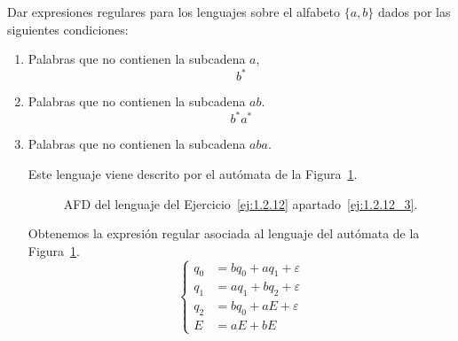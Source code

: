 \begin{ejercicio} \label{ej:1.2.12}
    Dar expresiones regulares para los lenguajes sobre el alfabeto $\{a, b\}$ dados por las siguientes condiciones:
    \begin{enumerate}
        \item Palabras que no contienen la subcadena $a$,
        \begin{equation*}
            b^*
        \end{equation*}
        \item Palabras que no contienen la subcadena $ab$.
        \begin{equation*}
            b^*a^*
        \end{equation*}
        \item \label{ej:1.2.12_3} %
        Palabras que no contienen la subcadena $aba$.
        
        Este lenguaje viene descrito por el autómata de la Figura~\ref{fig:ej:1.2.12_3}.
        \begin{figure}
            \centering
            \caption{AFD del lenguaje del Ejercicio~\ref{ej:1.2.12} apartado~\ref{ej:1.2.12_3}.}
            \label{fig:ej:1.2.12_3}
        \end{figure}

        Obtenemos la expresión regular asociada al lenguaje del autómata de la Figura~\ref{fig:ej:1.2.12_3}.
        \begin{equation*}
            \begin{cases}
                q_0 &= bq_0 + aq_1 + \varepsilon\\
                q_1 &= aq_1 + bq_2 + \varepsilon\\
                q_2 &= bq_0 + aE + \varepsilon\\
                E &= aE + bE
            \end{cases}
        \end{equation*}


\end{enumerate}
\end{ejercicio}
